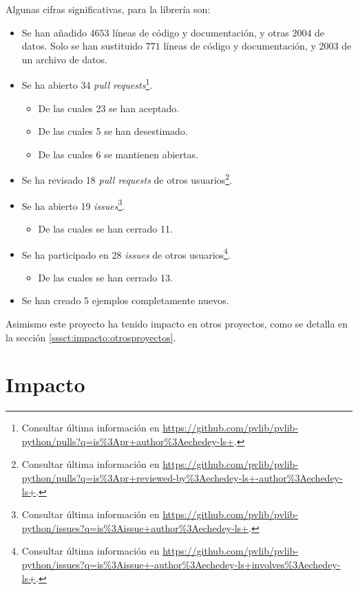 Algunas cifras significativas, para la librería \pvlibpy{} son:

\begin{itemize}
    \item Se han añadido $4653$ líneas de código y documentación, y otras $2004$ de datos. Solo se han sustituido $771$ líneas de código y documentación, y $2003$ de un archivo de datos.
    \item Se ha abierto 34 \textit{pull requests}\footnote{Consultar última información en \url{https://github.com/pvlib/pvlib-python/pulls?q=is\%3Apr+author\%3Aechedey-ls+}.}.
          \begin{itemize}
              \item De las cuales 23 se han aceptado.
              \item De las cuales 5 se han desestimado.
              \item De las cuales 6 se mantienen abiertas.
          \end{itemize}
    \item Se ha revisado 18 \textit{pull requests} de otros usuarios\footnote{Consultar última información en \url{https://github.com/pvlib/pvlib-python/pulls?q=is\%3Apr+reviewed-by\%3Aechedey-ls+-author\%3Aechedey-ls+}.}.
    \item Se ha abierto 19 \textit{issues}\footnote{Consultar última información en \url{https://github.com/pvlib/pvlib-python/issues?q=is\%3Aissue+author\%3Aechedey-ls+}.}.
          \begin{itemize}
              \item De las cuales se han cerrado 11.
          \end{itemize}
    \item Se ha participado en 28 \textit{issues} de otros usuarios\footnote{Consultar última información en \url{https://github.com/pvlib/pvlib-python/issues?q=is\%3Aissue+-author\%3Aechedey-ls+involves\%3Aechedey-ls+}.}.
          \begin{itemize}
              \item De las cuales se han cerrado 13.
          \end{itemize}
    \item Se han creado 5 ejemplos completamente nuevos.
\end{itemize}

Asimismo este proyecto ha tenido impacto en otros proyectos, como se detalla en la sección \ref{sssct:impacto:otrosproyectos}.

\section{Impacto} \label{chp:impacto}

